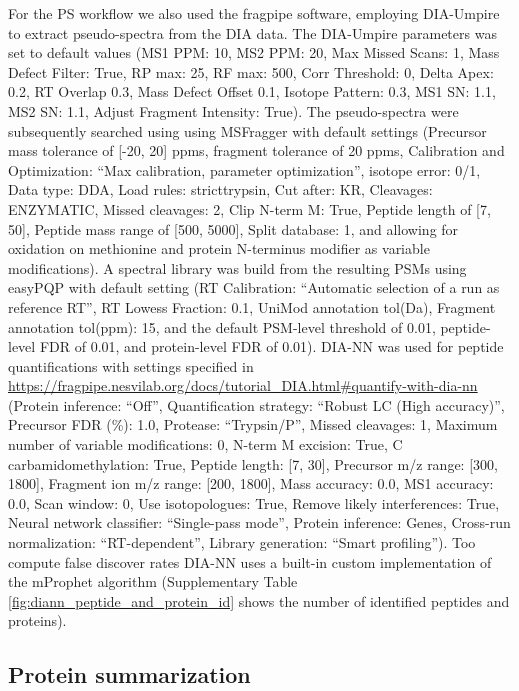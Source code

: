 \documentclass[10pt,letterpaper]{article}
\begin{document}
For the PS workflow we also used the fragpipe software, employing DIA-Umpire to extract pseudo-spectra from the DIA data. The DIA-Umpire parameters was set to default values (MS1 PPM: 10, MS2 PPM: 20, Max Missed Scans: 1, Mass Defect Filter: True, RP max: 25, RF max: 500, Corr Threshold: 0, Delta Apex: 0.2, RT Overlap 0.3, Mass Defect Offset 0.1, Isotope Pattern: 0.3, MS1 SN: 1.1, MS2 SN: 1.1, Adjust Fragment Intensity: True). The pseudo-spectra were subsequently searched using using MSFragger with default settings (Precursor mass tolerance of [-20, 20] ppms, fragment tolerance of 20 ppms, Calibration and Optimization: ``Max calibration, parameter optimization'', isotope error: 0/1, Data type: DDA, Load rules: stricttrypsin, Cut after: KR, Cleavages: ENZYMATIC, Missed cleavages: 2, Clip N-term M: True, Peptide length of [7, 50], Peptide mass range of [500, 5000], Split database: 1, and allowing for oxidation on methionine and protein N-terminus modifier as variable modifications). A spectral library was build from the resulting PSMs using easyPQP with default setting (RT Calibration: ``Automatic selection of a run as reference RT'', RT Lowess Fraction: 0.1, UniMod annotation tol(Da), Fragment annotation tol(ppm): 15, and the default PSM-level threshold of 0.01, peptide-level FDR of 0.01, and protein-level FDR of 0.01). DIA-NN was used for peptide quantifications with settings specified in \url{https://fragpipe.nesvilab.org/docs/tutorial_DIA.html#quantify-with-dia-nn} (Protein inference: ``Off'', Quantification strategy: ``Robust LC (High accuracy)'', Precursor FDR (\%): 1.0, Protease: ``Trypsin/P'', Missed cleavages: 1, Maximum number of variable modifications: 0, N-term M excision: True, C carbamidomethylation: True, Peptide length: [7, 30], Precursor m/z range: [300, 1800], Fragment ion m/z range: [200, 1800], Mass accuracy: 0.0, MS1 accuracy: 0.0, Scan window: 0, Use isotopologues: True, Remove likely interferences: True, Neural network classifier: ``Single-pass mode'', Protein inference: Genes, Cross-run normalization: ``RT-dependent'', Library generation: ``Smart profiling''). Too compute false discover rates DIA-NN uses a built-in custom implementation of the mProphet algorithm\cite{reiter2011mprophet, demichev2020dia} (Supplementary Table \ref{fig:diann_peptide_and_protein_id} shows the number of identified peptides and proteins). 
 
\subsection*{Protein summarization}
\end{document}
